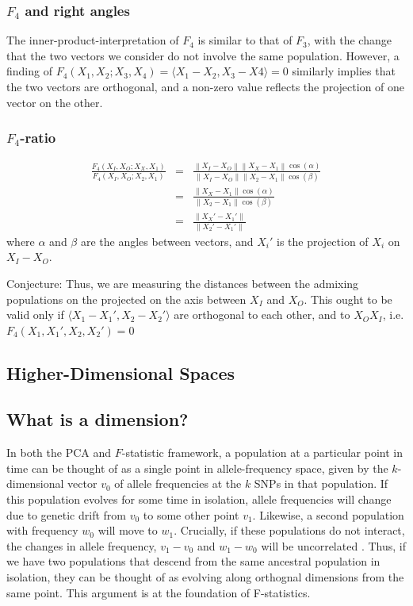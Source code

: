 \documentclass[12pt,a4pape, fullpage]{article}
\newcommand{\norm}[1]{\left\lVert#1\right\rVert}
\begin{document}
\subsubsection{$F_4$ and right angles}
The inner-product-interpretation of $F_4$ is similar to that of $F_3$, with the change that the two vectors we consider do not involve the same population. However, a finding of $F_4(X_1, X_2; X_3, X_4) = \langle X_1 - X_2, X_3 - X4 \rangle = 0$ similarly implies that the two vectors are orthogonal, and a non-zero value reflects the projection of one vector on the other.

\subsubsection{$F_4$-ratio}
\begin{eqnarray}
\frac{F_4(X_I, X_O; X_X, X_1)}{F_4(X_I, X_O; X_2, X_1)} &=& \frac{\norm{X_I-X_O}\norm{X_X-X_1}\cos(\alpha)}{\norm{X_I-X_O}\norm{X_2-X_1}\cos(\beta)}\nonumber\\
&=&\frac{\norm{X_X-X_1}\cos(\alpha)}{\norm{X_2-X_1}\cos(\beta)}\nonumber\\
&=& \frac{\norm{X_X' - X_1'}}{\norm{X_2' - X_1'}}
\end{eqnarray}
where $\alpha$ and $\beta$ are the angles between vectors, and $X_i'$ is the projection of $X_i$ on $X_I-X_O$.

Conjecture: Thus, we are measuring the distances between the admixing populations on the projected on the axis between $X_I$ and $X_O$. This ought to be valid only if $\langle X_1 - X_1', X_2 - X_2' \rangle$ are orthogonal to each other, and to $X_OX_I$, i.e.
$F_4(X_1, X_1', X_2, X_2') = 0$
 
	
\subsection{Higher-Dimensional Spaces}


	
	
	\subsection{What is a dimension?}
	In both the PCA and $F$-statistic framework, a population at  a particular point in time can be thought of as a single point in allele-frequency space, given by the $k$-dimensional vector $v_0$ of allele frequencies at the $k$ SNPs in that population. If this population evolves for some time in isolation, allele frequencies will change due to genetic drift from $v_0$ to some other point $v_1$. Likewise, a second population with frequency $w_0$ will move to $w_1$. Crucially, if these populations do not interact, the changes in allele frequency, $v_1 - v_0$ and $w_1 - w_0$ will be uncorrelated \cite{patterson2012}. Thus, if we have two populations that descend from the same ancestral population in isolation, they can be thought of as evolving along orthognal dimensions from the same point. This argument is at the foundation of F-statistics.
	
\end{document}
